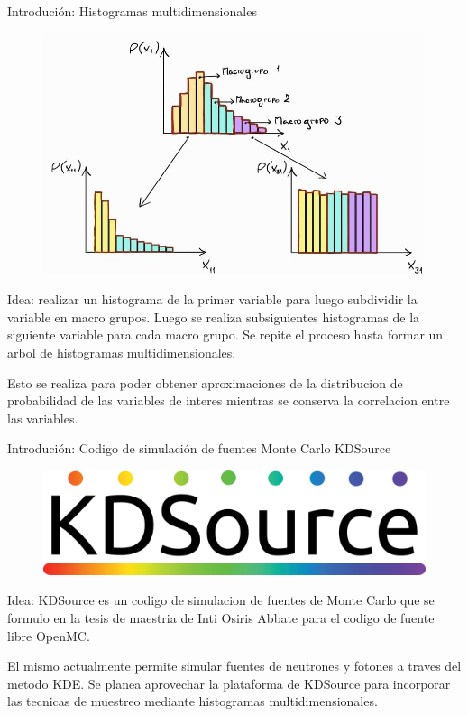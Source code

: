 \documentclass[aspectratio=169,english]{beamer}
\begin{document}
\begin{frame}{Introdución: Histogramas multidimensionales}
    \begin{figure}
        \centering
        \includegraphics[width=0.35\linewidth]{imagens/esquema2.jpeg}
        \label{fig:esquema2}
    \end{figure}

    Idea: realizar un histograma de la primer variable para luego subdividir la variable en macro grupos. Luego se 
    realiza subsiguientes histogramas de la siguiente variable para cada macro grupo. Se repite el proceso hasta formar
     un arbol de histogramas multidimensionales.

    Esto se realiza para poder obtener aproximaciones de la distribucion de probabilidad de las variables de interes mientras 
    se conserva la correlacion entre las variables.
\end{frame}

\begin{frame}{Introdución: Codigo de simulación de fuentes Monte Carlo KDSource}
    \begin{figure}
        \centering
        \includegraphics[width=0.35\linewidth]{imagens/esquema3.png}
        \label{fig:esquema3}
    \end{figure}

    Idea: KDSource es un codigo de simulacion de fuentes de Monte Carlo que se formulo en la tesis de maestria de 
    Inti Osiris Abbate para el codigo de fuente libre OpenMC. 
    
    El mismo actualmente permite simular fuentes de neutrones y fotones 
    a traves del metodo KDE. Se planea aprovechar la plataforma de KDSource para incorporar las tecnicas de muestreo
    mediante histogramas multidimensionales.
\end{frame}
\end{document}
